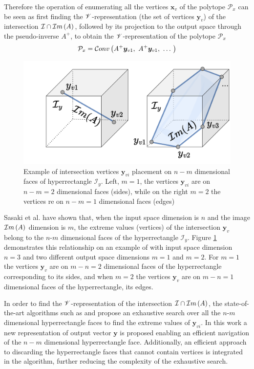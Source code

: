 Therefore the operation of enumerating all the vertices $\bm{x}_{v}$ of the polytope $\mathcal{P}_x$ can be seen as first finding the $\mathscr{V}$-representation (the set of vertices $\bm{y}_{v}$) of the intersection  $\mathcal{I}\cap \mathcal{I}m\left(A\right)$, followed by its projection to the output space through the pseudo-inverse $A^+$, to obtain the $\mathscr{V}$-representation of the polytope $\mathcal{P}_x$
\begin{equation}
    \mathcal{P}_x = \mathcal{C}onv\left(A^+\bm{y}_{v1},~A^+\bm{y}_{v1},~\ldots~ \right)
\end{equation}


\begin{figure}
    \centering
    \includegraphics[width=\linewidth]{Papers/images/intersetcion_size.pdf}
    \caption{Example of intersection vertices $\bm{y}_{vi}$ placement on $n\!-\!m$ dimensional faces of hyperrectangle $\mathcal{I}_y$. Left, $m=1$, the vertices $\bm{y}_{vi}$ are on $n\!-\!m\!=\!2$ dimensional faces (sides), while on the right $m=2$ the vertices re on $n\!-\!m\!=\!1$ dimensional faces (edges) }
    \label{fig:size_inter}
\end{figure}
Sasaki et al. \cite{sasaki_vertex_nodate} have shown that, when the input space dimension is $n$ and the image $\mathcal{I}m\left(A\right)$ dimension is $m$, the extreme values (vertices) of the intersection $\bm{y}_{v}$ belong to the $n$-$m$ dimensional faces of the hyperrectangle $\mathcal{I}_y$. Figure \ref{fig:size_inter} demonstrates this relationship on an example of with input space dimension $n=3$ and two different output space dimensions $m=1$ and $m=2$. For $m=1$ the vertices $\bm{y}_{v}$ are on $m-n=2$ dimensional faces of the hyperrectangle corresponding to its sides, and when $m=2$ the vertices  $\bm{y}_{v}$ are on $m-n=1$ dimensional faces of the hyperrectangle, its edges.



In order to find the  $\mathscr{V}$-representation of the intersection  $\mathcal{I}\cap \mathcal{I}m\left(A\right)$, the state-of-the-art algorithms such as \cite{chiacchio_evaluation_1996} and \cite{sasaki_vertex_nodate} propose an exhaustive search over all the $n$-$m$ dimensional hyperrectangle faces to find the extreme values of $\bm{y}_{vi}$. In this work a new representation of output vector $\bm{y}$ is proposed enabling an efficient navigation of the $n-m$ dimensional hyperrectangle face. Additionally, an efficient approach to discarding the hyperrectangle faces that cannot contain vertices is integrated in the algorithm, further reducing the complexity of the exhaustive search.

